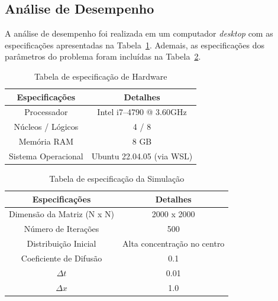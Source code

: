 \documentclass[12pt]{article}
\begin{document}
\subsection{Análise de Desempenho}

A análise de desempenho foi realizada em um computador \textit{desktop} com as
especificações apresentadas na Tabela~\ref{tab:especificacaoHardware}. Ademais,
as especificações dos parâmetros do
problema foram incluídas na Tabela~\ref{tab:especificacaoSimulacao}.

\begin{table}[ht]
  \centering
  \caption{Tabela de especificação de Hardware}
  \vspace{0.3cm}
  \begin{tabular}{||c c||}
    \hline
    Especificações      & Detalhes                  \\ [0.5ex]
    \hline\hline
    Processador         & Intel i7--4790 @ 3.60GHz  \\
    \hline
    Núcleos / Lógicos   & 4 / 8                     \\
    \hline
    Memória RAM         & 8 GB                      \\
    \hline
    Sistema Operacional & Ubuntu 22.04.05 (via WSL) \\
    \hline
  \end{tabular}
  \label{tab:especificacaoHardware}
\end{table}

\begin{table}[ht]
  \centering
  \caption{Tabela de especificação da Simulação}
  \vspace{0.3cm}
  \begin{tabular}{||c c||}
    \hline
    Especificações             & Detalhes                    \\ [0.5ex]
    \hline\hline
    Dimensão da Matriz (N x N) & 2000 x 2000                 \\
    \hline
    Número de Iterações        & 500                         \\
    \hline
    Distribuição Inicial       & Alta concentração no centro \\
    \hline
    Coeficiente de Difusão     & 0.1                         \\
    \hline
    $\Delta t$                         & 0.01                        \\
    \hline
    $\Delta x$                         & 1.0                         \\
    \hline
  \end{tabular}
  \label{tab:especificacaoSimulacao}
\end{table}
\end{document}
